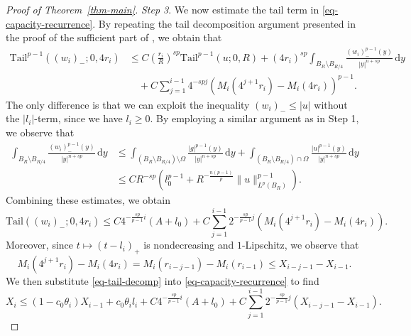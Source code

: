 \documentclass[11pt]{amsart}
\theoremstyle{plain}
\theoremstyle{definition}
\numberwithin{equation}{section}
\begin{document}
\begin{proof}[Proof of Theorem~\ref{thm-main}]
\emph{Step 3}. We now estimate the tail term in \eqref{eq-capacity-recurrence}. By repeating the tail decomposition argument presented in the proof of the sufficient part of \cite[Theorem~1.1]{KLL23}, we obtain that
    \begin{equation*}
        \begin{aligned}
            \mathrm{Tail}^{p-1}((w_i)_-; 0, 4r_i) &\leq C\left(\frac{r_i}{R}\right)^{sp}\mathrm{Tail}^{p-1}(u; 0, R)+(4r_i)^{sp} \int_{B_R \setminus B_{R/4}} \frac{(w_i)^{p-1}_-(y)}{|y|^{n+sp}}\,\mathrm{d}y\\
            &\quad+C\sum_{j=1}^{i-1}4^{-spj} (M_i(4^{j+1}r_i)-M_i(4r_i))^{p-1}.
        \end{aligned}
    \end{equation*}
     The only difference is that we can exploit the inequality $(w_{i})_- \leq |u|$ without the $|l_i|$-term, since we have $l_i\geq 0$. By employing a similar argument as in Step 1, we observe that
    \begin{equation*}  
        \begin{aligned}
             \int_{B_R \setminus B_{R/4}} \frac{(w_i)^{p-1}_-(y)}{|y|^{n+sp}}\,\mathrm{d}y&\leq\int_{(B_R\setminus B_{R/4})\setminus \Omega} \frac{|g|^{p-1}(y)}{|y|^{n+sp}}\,\mathrm{d}y+\int_{(B_R\setminus B_{R/4})  \cap \Omega} \frac{|u|^{p-1}(y)}{|y|^{n+sp}}\,\mathrm{d}y\\
             &\leq CR^{-sp}\left(l_0^{p-1}+R^{-\frac{n(p-1)}{p}}\|u\|_{L^p(B_R)}^{p-1} \right).
        \end{aligned}
    \end{equation*}
Combining these estimates, we obtain
     \begin{equation}\label{eq-tail-decomp}
        \mathrm{Tail}((w_i)_-; 0, 4r_i) \leq C4^{-\frac{sp}{p-1}i}(A+l_0)+C\sum_{j=1}^{i-1}2^{-\frac{sp}{p-1}j}(M_{i}(4^{j+1}r_i)-M_{i}(4r_i)).
    \end{equation}
    Moreover, since $t \mapsto (t-l_i)_+$ is nondecreasing and $1$-Lipschitz, we observe that
    \begin{equation*}
        M_i(4^{j+1}r_i)-M_i(4r_i)=M_i(r_{i-j-1})-M_i(r_{i-1}) \leq X_{i-j-1}-X_{i-1}.
    \end{equation*}
    We then substitute \eqref{eq-tail-decomp} into \eqref{eq-capacity-recurrence} to find 
    \begin{equation*}
         X_i \leq (1-c_0\theta_i)X_{i-1}+c_0\theta_il_i+C4^{-\frac{sp}{p-1}i}(A+l_0)+C\sum_{j=1}^{i-1}2^{-\frac{sp}{p-1}j}(X_{i-j-1}-X_{i-1}).
    \end{equation*}

\end{proof}
\end{document}
